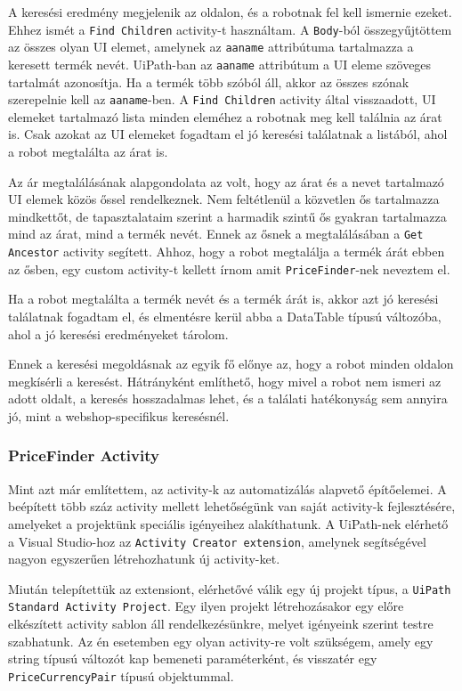 \documentclass[
]{thesis-ekf}
\theoremstyle{definition}
\theoremstyle{remark}
\begin{document}
A keresési eredmény megjelenik az oldalon, és a robotnak fel kell ismernie ezeket. Ehhez ismét a \texttt{Find Children} activity-t használtam. A \texttt{Body}-ból összegyűjtöttem az összes olyan UI elemet, amelynek az \texttt{aaname} attribútuma tartalmazza a keresett termék nevét. UiPath-ban az \texttt{aaname} attribútum a UI eleme szöveges tartalmát azonosítja. Ha a termék több szóból áll, akkor az összes szónak szerepelnie kell az \texttt{aaname}-ben. A \texttt{Find Children} activity által visszaadott, UI elemeket tartalmazó lista minden eleméhez a robotnak meg kell találnia az árat is. Csak azokat az UI elemeket fogadtam el jó keresési találatnak a listából, ahol a robot megtalálta az árat is.

Az ár megtalálásának alapgondolata az volt, hogy az árat és a nevet tartalmazó UI elemek közös őssel rendelkeznek. Nem feltétlenül a közvetlen ős tartalmazza mindkettőt, de tapasztalataim szerint a harmadik szintű ős gyakran tartalmazza mind az árat, mind a termék nevét. Ennek az ősnek a megtalálásában a \texttt{Get Ancestor} activity segített. Ahhoz, hogy a robot megtalálja a termék árát ebben az ősben, egy custom activity-t kellett írnom amit \texttt{PriceFinder}-nek neveztem el. 

Ha a robot megtalálta a termék nevét és a termék árát is, akkor azt jó keresési találatnak fogadtam el, és elmentésre kerül abba a DataTable típusú változóba, ahol a jó keresési eredményeket tárolom.

Ennek a keresési megoldásnak az egyik fő előnye az, hogy a robot minden oldalon megkísérli a keresést. Hátrányként említhető, hogy mivel a robot nem ismeri az adott oldalt, a keresés hosszadalmas lehet, és a találati hatékonyság sem annyira jó, mint a webshop-specifikus keresésnél.


\subsubsection*{PriceFinder Activity \cite{ActivityCreator}}
Mint azt már említettem, az activity-k az automatizálás alapvető építőelemei. A beépített több száz activity mellett lehetőségünk van saját activity-k fejlesztésére, amelyeket a projektünk speciális igényeihez alakíthatunk. A UiPath-nek elérhető a Visual Studio-hoz az \texttt{Activity Creator extension}, amelynek segítségével nagyon egyszerűen létrehozhatunk új activity-ket.

Miután telepítettük az extensiont, elérhetővé válik egy új projekt típus, a \texttt{UiPath Standard Activity Project}. Egy ilyen projekt létrehozásakor egy előre elkészített activity sablon áll rendelkezésünkre, melyet igényeink szerint testre szabhatunk. Az én esetemben egy olyan activity-re volt szükségem, amely egy string típusú változót kap bemeneti paraméterként, és visszatér egy \texttt{PriceCurrencyPair} típusú objektummal.
\end{document}
